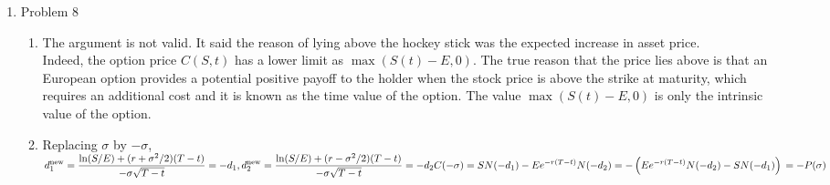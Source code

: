 \documentclass[a4paper]{article}
\def\lb{\left(}
\def\rb{\right)}
\begin{document}
\begin{enumerate}
\pagebreak

\item Problem 8
\begin{enumerate}
\item
The argument is not valid. It said the reason of lying above the hockey stick was the expected increase in asset price.\\
Indeed, the option price $C(S,t)$ has a lower limit as $\max(S(t)-E,0)$. The true reason that the price lies above is that an European option provides a potential positive payoff to the holder when the stock price is above the strike at maturity, which requires an additional cost and it is known as the time value of the option. The value $\max(S(t)-E,0)$ is only the intrinsic value of the option.

\item
Replacing $\sigma$ by $-\sigma$,\\
$\displaystyle d_1^{\text{new}}=\frac{\ln(S/E)+(r+\sigma^2/2)(T-t)}{-\sigma\sqrt{T-t}}=-d_1, d_2^{\text{new}}=\frac{\ln(S/E)+(r-\sigma^2/2)(T-t)}{-\sigma\sqrt{T-t}}=-d_2\\
C(-\sigma)=SN(-d_1)-Ee^{-r(T-t)}N(-d_2)\\
=-\lb Ee^{-r(T-t)}N(-d_2)-SN(-d_1)\rb\\
=-P(\sigma)$
\end{enumerate}

\pagebreak


\end{enumerate}
\end{document}
